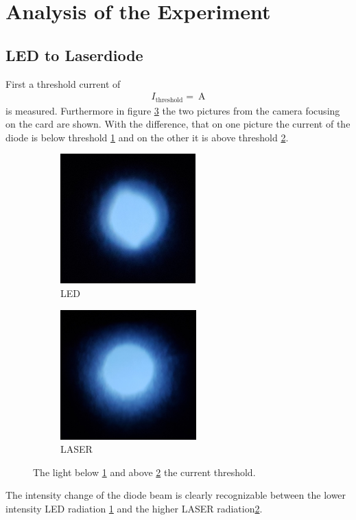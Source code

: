 \section{Analysis of the Experiment}
\label{sec:Auswertung}



\subsection{LED to Laserdiode}
\label{sec:LED_Laser}
First a threshold current of
\begin{align}
I_{\mathrm{threshold}} = \SI{}{\ampere}
\end{align}
is measured.
Furthermore in figure \ref{fig:threshold} the two
pictures from the camera focusing on the card are shown.
With the difference, that on one picture the current of the diode is below threshold \ref{fig:LED} and
on the other it is above threshold \ref{fig:LASER}.
\begin{figure}
  \centering
  \begin{subfigure}{0.45\textwidth}
    \centering
    \includegraphics[height = 5cm]{figures/bevore_threshole.jpg}
    \caption{LED}
    \label{fig:LED}
  \end{subfigure}
  \begin{subfigure}{0.45\textwidth}
    \centering
    \includegraphics[height = 5cm]{figures/after_threshole.jpg}
    \caption{LASER}
    \label{fig:LASER}
  \end{subfigure}
\caption{The light below \ref{fig:LED} and above \ref{fig:LASER} the current threshold.}
\label{fig:threshold}
\end{figure}
The intensity change of the diode beam is clearly recognizable
between the lower intensity LED radiation \ref{fig:LED}
and the higher LASER radiation\ref{fig:LASER}.


